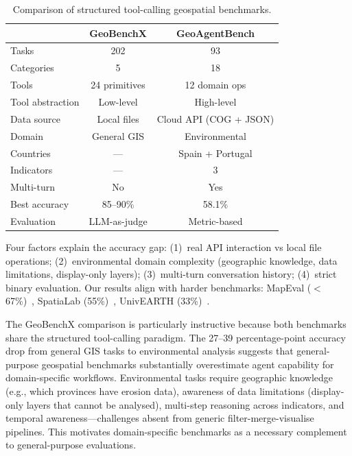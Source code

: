 \documentclass[10pt,twocolumn]{article}
\begin{document}
\begin{table}[t]
\centering
\small
\caption{Comparison of structured tool-calling geospatial benchmarks.}
\label{tab:benchmark_comparison}
\begin{tabular}{lcc}
\toprule
& \textbf{GeoBenchX} & \textbf{GeoAgentBench} \\
\midrule
Tasks              & 202            & 93 \\
Categories         & 5              & 18 \\
Tools              & 24 primitives  & 12 domain ops \\
Tool abstraction   & Low-level      & High-level \\
Data source        & Local files    & Cloud API (COG + JSON) \\
Domain             & General GIS    & Environmental \\
Countries          & ---            & Spain + Portugal \\
Indicators         & ---            & 3 \\
Multi-turn         & No             & Yes \\
Best accuracy      & 85--90\%       & 58.1\% \\
Evaluation         & LLM-as-judge   & Metric-based \\
\bottomrule
\end{tabular}
\end{table}

Four factors explain the accuracy gap: (1)~real API interaction vs local file operations; (2)~environmental domain complexity (geographic knowledge, data limitations, display-only layers); (3)~multi-turn conversation history; (4)~strict binary evaluation. Our results align with harder benchmarks: MapEval ($<$67\%)~\cite{dihan2025mapeval}, SpatiaLab (55\%)~\cite{wasi2026spatialab}, UnivEARTH (33\%)~\cite{kao2025univearth}.

The GeoBenchX comparison is particularly instructive because both benchmarks share the structured tool-calling paradigm. The 27--39 percentage-point accuracy drop from general GIS tasks to environmental analysis suggests that general-purpose geospatial benchmarks substantially overestimate agent capability for domain-specific workflows. Environmental tasks require geographic knowledge (e.g., which provinces have erosion data), awareness of data limitations (display-only layers that cannot be analysed), multi-step reasoning across indicators, and temporal awareness---challenges absent from generic filter-merge-visualise pipelines. This motivates domain-specific benchmarks as a necessary complement to general-purpose evaluations.
\end{document}
